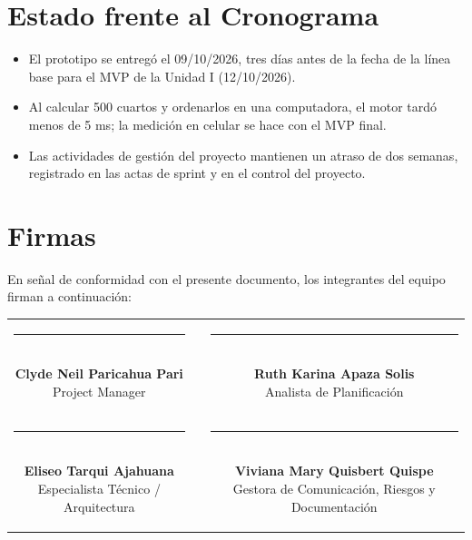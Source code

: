 \documentclass[11pt,a4paper]{article}
\begin{document}
\section{Estado frente al Cronograma}
\begin{itemize}[leftmargin=*]
    \item El prototipo se entregó el 09/10/2026, tres días antes de la fecha de la línea base para el MVP de la Unidad I (12/10/2026).
    \item Al calcular 500 cuartos y ordenarlos en una computadora, el motor tardó menos de 5 ms; la medición en celular se hace con el MVP final.
    \item Las actividades de gestión del proyecto mantienen un atraso de dos semanas, registrado en las actas de sprint y en el control del proyecto.
\end{itemize}

\section{Firmas}
\noindent En señal de conformidad con el presente documento, los integrantes del equipo firman a continuación:

\vspace{1.5cm}
\begin{center}
\begin{tabular}{c c c}
    \parbox{6.5cm}{\centering \rule{6.0cm}{0.6pt}\\[5pt] \textbf{Clyde Neil Paricahua Pari}\\[2pt] {\footnotesize Project Manager}}
    & \hspace{0.8cm} &
    \parbox{6.5cm}{\centering \rule{6.0cm}{0.6pt}\\[5pt] \textbf{Ruth Karina Apaza Solis}\\[2pt] {\footnotesize Analista de Planificación}}
    \\[2.0cm]
    \parbox{6.5cm}{\centering \rule{6.0cm}{0.6pt}\\[5pt] \textbf{Eliseo Tarqui Ajahuana}\\[2pt] {\footnotesize Especialista Técnico / Arquitectura}}
    & \hspace{0.8cm} &
    \parbox{6.5cm}{\centering \rule{6.0cm}{0.6pt}\\[5pt] \textbf{Viviana Mary Quisbert Quispe}\\[2pt] {\footnotesize Gestora de Comunicación, Riesgos y Documentación}}
\end{tabular}
\end{center}
\end{document}
